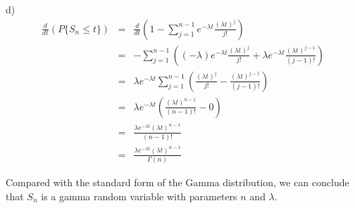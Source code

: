 \documentclass[12pt]{article}
\begin{document}
d)
\begin{eqnarray*}
  \frac {d}{d t} \left( P \{ S_n \le t \} \right)
  &=& \frac {d}{d t} \left( 
    1 - \sum_{j=1}^{n-1} e^{- \lambda t} \frac {(\lambda t)^j}{j!} \right) \\
  &=& - \sum_{j=1}^{n-1} \left(
    (- \lambda) e^{- \lambda t} \frac {(\lambda t)^j}{j!}
    + \lambda e^{- \lambda t} \frac {(\lambda t)^{j-1}}{(j-1)!} \right) \\
  &=& \lambda e^{- \lambda t} \sum_{j=1}^{n-1} \left(
    \frac {(\lambda t)^j}{j!} - \frac {(\lambda t)^{j-1}}{(j-1)!}
  \right) \\
  &=& \lambda e^{- \lambda t} \left(
    \frac {(\lambda t)^{n-1}}{(n-1)!} - 0 \right) \\
  &=& \frac {\lambda e^{- \lambda t} (\lambda t)^{n-1}}{(n-1)!} \\
  &=& \frac {\lambda e^{- \lambda t} (\lambda t)^{n-1}}{\Gamma (n)}
\end{eqnarray*}

Compared with the standard form of the Gamma distribution, we can conclude that $S_n$ is a gamma random variable with parameters $n$ and $\lambda$.
\end{document}
